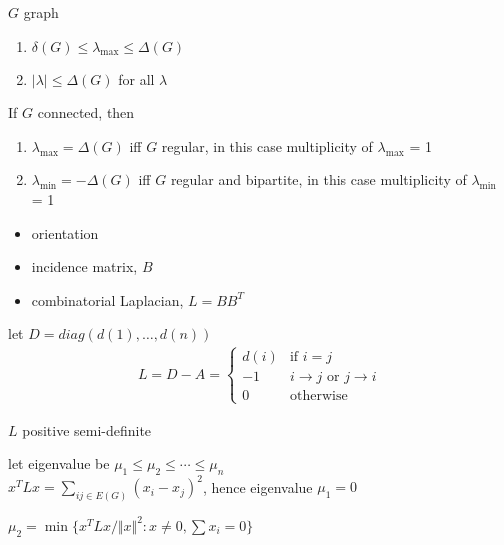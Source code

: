 \begin{thm}
    $G$ graph
    \begin{enumerate}
        \item $\delta(G) \leq \lambda_{\max} \leq \Delta(G)$
        \item $|\lambda| \leq \Delta(G)$ for all $\lambda$
    \end{enumerate}
    If $G$ connected, then
    \begin{enumerate}
        \item $\lambda_{\max} = \Delta(G)$ iff $G$ regular, in this case multiplicity of $\lambda_{\max}$ = 1
        \item $\lambda_{\min} = -\Delta(G)$ iff $G$ regular and bipartite, in this case multiplicity of $\lambda_{\min}$ = 1
    \end{enumerate}
\end{thm}

\begin{itemize}
    \item orientation
    \item incidence matrix, $B$
    \item combinatorial Laplacian, $L = BB^T$
\end{itemize}

\begin{fact}
    let $D = diag(d(1), \dots,  d(n))$
    \begin{align*}
        L = D - A =
        \begin{cases}
            d(i) & \text{if $i = j$} \\
            -1 & \text{$i \rightarrow j$ or $j \rightarrow i$} \\
            0 & \text{otherwise}
        \end{cases}
    \end{align*}
\end{fact}

\begin{fact}
    $L$ positive semi-definite
\end{fact}

\begin{fact}
    let eigenvalue be $\mu_1 \leq \mu_2 \leq \cdots \leq \mu_n$ \\
    $x^T L x = \sum_{ij \in E(G)} (x_i - x_j)^2$, hence eigenvalue $\mu_1 = 0$
\end{fact}

\begin{prop}
    $\mu_2 = \min\{ x^T L x / \Vert x \Vert^2 : x \neq 0, \sum x_i = 0\}$
\end{prop}

